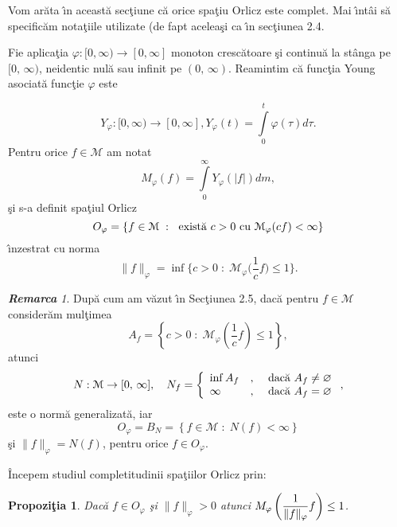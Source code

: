 \documentclass[ a4paper, 12pt]{report}
\newtheorem{prop}[theorem]{\bf Propozi\c tia }
\theoremstyle{definition}
\theoremstyle{remark}
\newtheorem{remarc}{\bf Remarca}[section]
\numberwithin{equation}{section}
\begin{document}
$\,$

Vom ar\u ata \^\i n aceast\u a sec\c tiune c\u a orice spa\c tiu Orlicz este complet. Mai \^\i nt\^ ai s\u a specific\u am nota\c tiile utilizate (de fapt acelea\c si ca \^\i n sec\c tiunea 2.4.

Fie aplica\c tia $\varphi : [0,\infty) \rightarrow [0,\infty]$ monoton cresc\u atoare \c si continu\u a la st\^ anga pe $[0, \, \infty)$, neidentic nul\u a sau infinit pe $(0, \, \infty)$. Reamintim c\u a func\c tia Young asociat\u a func\c tie $\varphi$ este

$$Y_\varphi : [0,\infty) \rightarrow [0,\infty], Y_\varphi(t) = \int\limits_{0}^{t} \varphi(\tau) d \tau.$$
Pentru orice $f \in \mathcal{M}$ am notat
$$M_\varphi(f) = \int\limits_{0}^{\infty} Y_\varphi(\lvert f \rvert) dm,$$
\c si s-a definit spa\c tiul Orlicz
$$O_\varphi = \{f \in \mathcal{M} \; : \; \hbox{ exist\u a } c>0  \hbox{ cu } \mathcal{M}_\varphi(cf)<\infty\}$$
\^\i nzestrat cu norma
$$\lVert f \rVert_\varphi = \inf\Big\{ c>0 \; : \; \mathcal{M}_\varphi\Big(\frac{1}{c}f\Big) \leq 1\Big \}.$$

\begin{remarc} Dup\u a cum am v\u azut \^\i n Sec\c tiunea 2.5, dac\u a pentru $f \in \mathcal{M}$ consider\u am mul\c timea
$$A_f = \left\{ c>0 \; : \;  \mathcal{M}_\varphi(\frac{1}{c}f) \leq 1 \right\},$$ atunci
$$N : \mathcal{M} \rightarrow [0,\, \infty], \quad N_f = \left\{ \begin{array}{lcl} \inf A_f&,& \hbox{ dac\u a } A_f \neq \varnothing\\
\infty &,& \hbox{ dac\u a } A_f = \varnothing \end{array} \right.,$$ este o norm\u a generalizat\u a, iar
$$O_\varphi = B_N = \left\{ f \in \mathcal{M} \; : \;  N(f) < \infty \right\}$$ \c si $\lVert f \rVert_\varphi = N(f)$, pentru orice $f \in O_\varphi.$
\end{remarc}

\^ Incepem studiul completitudinii spa\c tiilor Orlicz prin:

\begin{prop}
Dac\u a $f \in O_\varphi$ \c si $\lVert f \rVert_\varphi >0$ atunci $ M_\varphi\left (\displaystyle\frac{1}{\lVert f \rVert_\varphi}f\right )\leq 1$.
\end{prop}
\end{document}

